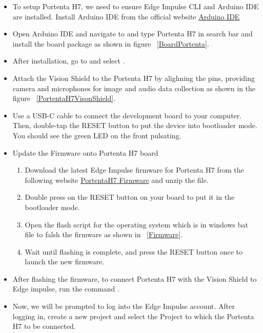 \begin{itemize}
	\item To setup Portenta H7, we need to ensure Edge Impulse CLI and Arduino IDE are installed. Install Arduino IDE from the official website \href{https://www.arduino.cc/en/software}{Arduino IDE}
	\item Open Arduino IDE and navigate to  and type Portenta H7 in search bar and install the  board package as shown in figure ~\ref{BoardPortenta}.
	\item After installation, go to  and select .
	\item Attach the Vision Shield to the Portenta H7 by alighning the pins, providing camera and microphones for image and audio data collection as shown in the figure ~\ref{PortentaH7VisonShield}.
	\item Use a USB-C cable to connect the development board to your computer. Then, double-tap the RESET button to put the device into bootloader mode. You should see the green LED on the front pulsating.
	\item Update the Firmware onto Portenta H7 board
	\begin{enumerate}
		\item Download the latest Edge Impulse firmware for Portenta H7 from the following website \href{https://docs.edgeimpulse.com/docs/edge-ai-hardware/mcu/arduino-portenta-h7}{PortentaH7 Firmware} and unzip the file.
		\item Double press on the RESET button on your board to put it in the bootloader mode.
		\item Open the flash script for the operating system which is in windows bat file  to falsh the firmware as shown in ~\ref{Firmware}.
		\item Wait until flashing is complete, and press the RESET button once to launch the new firmware.
	\end{enumerate}
	\item After flashing the firmware, to connect Portenta H7 with the Vision Shield to Edge impulse, run the command .
	\item Now, we will be prompted to log into the Edge Impulse account.
	After logging in, create a new project and select the Project to which the Portenta H7 to be connected.
\end{itemize}

